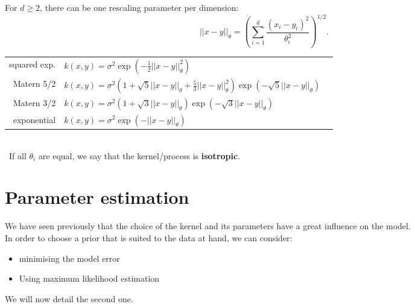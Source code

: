 \documentclass{beamer}
\newcommand\Ni[2]{{|| #1 ||}_{\! #2}}
\begin{document}
\begin{frame}{}
For $d \geq 2$, there can be one rescaling parameter per dimension:
\begin{equation*}
  \Ni{x-y}{\theta} = \left( \sum_{i=1}^d \frac{(x_i-y_i)^2}{\theta_i^2} \right)^{1/2}.
\end{equation*}
\vspace{2mm}
\scriptsize
\begin{tabular}{rlN}
        squared exp. & $\displaystyle k(x,y) = \sigma^2 \exp \left(- \frac12 \Ni{x-y}{\theta}^2 \right)$ &\\[6mm]
        Matern 5/2 & $\displaystyle k(x,y) = \sigma^2 \left(1 + \sqrt{5}\Ni{x-y}{\theta} + \frac{5}{3}\Ni{x-y}{\theta}^2 \right) \exp \left(- \sqrt{5}\Ni{x-y}{\theta} \right)$ &\\[6mm]
        Matern 3/2 & $\displaystyle k(x,y) = \sigma^2 \left(1 + \sqrt{3}\Ni{x-y}{\theta} \right) \exp \left(- \sqrt{3}\Ni{x-y}{\theta}  \right)$ &\\[6mm]
        exponential & $\displaystyle k(x,y) = \sigma^2 \exp \left(- \Ni{x-y}{\theta} \right)$ 
\end{tabular}
\normalsize
\\ \vspace{5mm} \
If all $\theta_i$ are equal, we say that the kernel/process is \textbf{isotropic}.
\end{frame}


\section[Param Estim]{Parameter estimation}

\begin{frame}{}
We have seen previously that the choice of the kernel and its parameters have a great influence on the model. \\ \vspace{5mm}
In order to choose a prior that is suited to the data at hand, we can consider:
\begin{itemize}
  \item minimising the model error
  \item Using maximum likelihood estimation 
\end{itemize}
We will now detail the second one.
\end{frame}
\end{document}
